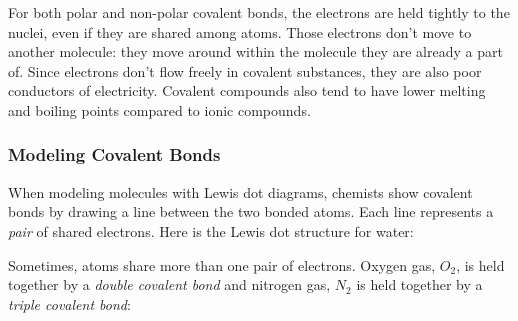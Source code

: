 For both polar and non-polar covalent bonds, the electrons are held tightly to 
the nuclei, even if they are shared among atoms. Those electrons don't move to 
another molecule: they move around within the molecule they are already a part 
of. Since electrons don't flow freely in covalent substances, they are also poor 
conductors of electricity. Covalent compounds also tend to have lower melting and 
boiling points compared to ionic compounds. 

\subsubsection{Modeling Covalent Bonds}
When modeling molecules with Lewis dot diagrams, chemists show covalent bonds by 
drawing a line between the two bonded atoms. Each line represents a \textit{pair} 
of shared electrons. Here is the Lewis dot structure for water:

\begin{center}
\end{center}

Sometimes, atoms share more than one pair of electrons. Oxygen gas, $O_2$, is held
together by a \textit{double covalent bond} and nitrogen gas, $N_2$ is held 
together by a \textit{triple covalent bond}:  
  

